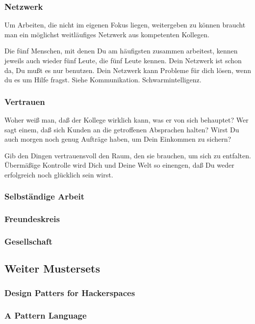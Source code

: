 \subsubsection{Netzwerk}
\begin{em}
Um Arbeiten, die nicht im eigenen Fokus liegen, weitergeben zu können braucht man ein möglichst 
weitläufiges Netzwerk aus kompetenten Kollegen.
\end{em}



Die fünf Menschen, mit denen Du am häufigsten zusammen arbeitest, kennen jeweils auch wieder fünf 
Leute, die fünf Leute kennen.
%
Dein Netzwerk ist schon da, Du mußt es nur benutzen.
%
Dein Netzwerk kann Probleme für dich lösen, wenn du es um Hilfe fragst.
%
Siehe Kommunikation. Schwarmintelligenz.
   



\subsubsection{Vertrauen}
\begin{em}
Woher weiß man, daß der Kollege wirklich kann, was er von sich behauptet? Wer sagt einem, daß sich Kunden an die getroffenen Absprachen halten? Wirst Du auch morgen noch genug Aufträge haben, um Dein Einkommen zu sichern?
\end{em}



Gib den Dingen vertrauensvoll den Raum, den sie brauchen, um sich zu entfalten. Übermäßige 
Kontrolle wird Dich und Deine Welt so einengen, daß Du weder erfolgreich noch glücklich sein wirst.


\subsubsection{Selbständige Arbeit}


\subsubsection{Freundeskreis}


\subsubsection{Gesellschaft}


\subsection{Weiter Mustersets}

\subsubsection{Design Patters for Hackerspaces}

\subsubsection{A Pattern Language}
